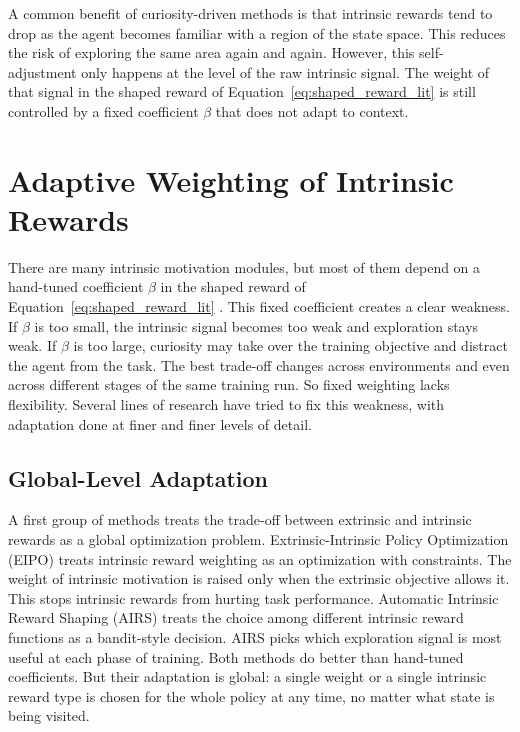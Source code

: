 A common benefit of curiosity-driven methods is that intrinsic rewards tend to drop as the agent becomes familiar with a region of the state space. This reduces the risk of exploring the same area again and again. However, this self-adjustment only happens at the level of the raw intrinsic signal. The weight of that signal in the shaped reward of Equation~\eqref{eq:shaped_reward_lit} is still controlled by a fixed coefficient $\beta$ that does not adapt to context.

\section{Adaptive Weighting of Intrinsic Rewards}
There are many intrinsic motivation modules, but most of them depend on a hand-tuned coefficient $\beta$ in the shaped reward of Equation~\eqref{eq:shaped_reward_lit} \cite{pathak2017curiosity, burda2019rnd}. This fixed coefficient creates a clear weakness. If $\beta$ is too small, the intrinsic signal becomes too weak and exploration stays weak. If $\beta$ is too large, curiosity may take over the training objective and distract the agent from the task. The best trade-off changes across environments and even across different stages of the same training run. So fixed weighting lacks flexibility. Several lines of research have tried to fix this weakness, with adaptation done at finer and finer levels of detail.

\subsection{Global-Level Adaptation}
A first group of methods treats the trade-off between extrinsic and intrinsic rewards as a global optimization problem. Extrinsic-Intrinsic Policy Optimization (EIPO) \cite{chen2022eipo} treats intrinsic reward weighting as an optimization with constraints. The weight of intrinsic motivation is raised only when the extrinsic objective allows it. This stops intrinsic rewards from hurting task performance. Automatic Intrinsic Reward Shaping (AIRS) \cite{yuan2023airs} treats the choice among different intrinsic reward functions as a bandit-style decision. AIRS picks which exploration signal is most useful at each phase of training. Both methods do better than hand-tuned coefficients. But their adaptation is global: a single weight or a single intrinsic reward type is chosen for the whole policy at any time, no matter what state is being visited.

